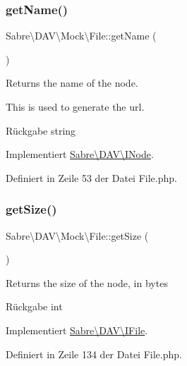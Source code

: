 \subsubsection{\texorpdfstring{get\+Name()}{getName()}}
{\footnotesize\ttfamily Sabre\textbackslash{}\+D\+A\+V\textbackslash{}\+Mock\textbackslash{}\+File\+::get\+Name (\begin{DoxyParamCaption}{ }\end{DoxyParamCaption})}

Returns the name of the node.

This is used to generate the url.

\begin{DoxyReturn}{Rückgabe}
string 
\end{DoxyReturn}


Implementiert \mbox{\hyperlink{interface_sabre_1_1_d_a_v_1_1_i_node_ab616fe836b1ae36af12126a2bc934dce}{Sabre\textbackslash{}\+D\+A\+V\textbackslash{}\+I\+Node}}.



Definiert in Zeile 53 der Datei File.\+php.

\mbox{\label{class_sabre_1_1_d_a_v_1_1_mock_1_1_file_aca58982336f6d9a272cd3617b56fce39}} 
\subsubsection{\texorpdfstring{get\+Size()}{getSize()}}
{\footnotesize\ttfamily Sabre\textbackslash{}\+D\+A\+V\textbackslash{}\+Mock\textbackslash{}\+File\+::get\+Size (\begin{DoxyParamCaption}{ }\end{DoxyParamCaption})}

Returns the size of the node, in bytes

\begin{DoxyReturn}{Rückgabe}
int 
\end{DoxyReturn}


Implementiert \mbox{\hyperlink{interface_sabre_1_1_d_a_v_1_1_i_file_aa1534e00805f45d9282de9c699dbe178}{Sabre\textbackslash{}\+D\+A\+V\textbackslash{}\+I\+File}}.



Definiert in Zeile 134 der Datei File.\+php.

